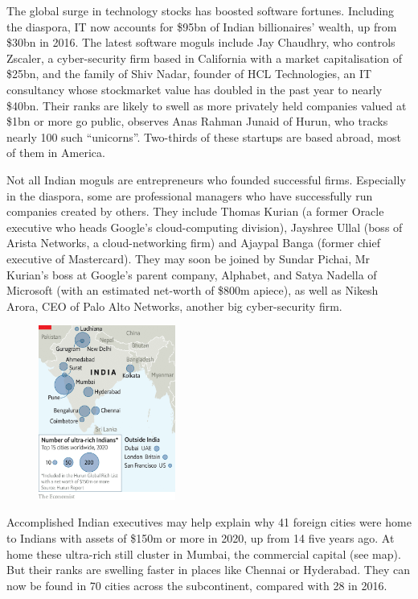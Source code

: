 \documentclass{article}
\begin{document}
The global surge in technology stocks has boosted software fortunes. Including the diaspora, IT now accounts for \$95bn of Indian billionaires' wealth, up from \$30bn in 2016. The latest software moguls include Jay Chaudhry, who controls Zscaler, a cyber-security firm based in California with a market capitalisation of \$25bn, and the family of Shiv Nadar, founder of HCL Technologies, an IT consultancy whose stockmarket value has doubled in the past year to nearly \$40bn. Their ranks are likely to swell as more privately held companies valued at \$1bn or more go public, observes Anas Rahman Junaid of Hurun, who tracks nearly 100 such ``unicorns''. Two-thirds of these startups are based abroad, most of them in America. 

Not all Indian moguls are entrepreneurs who founded successful firms. Especially in the diaspora, some are professional managers who have successfully run companies created by others. They include Thomas Kurian (a former Oracle executive who heads Google's cloud-computing division), Jayshree Ullal (boss of Arista Networks, a cloud-networking firm) and Ajaypal Banga (former chief executive of Mastercard). They may soon be joined by Sundar Pichai, Mr Kurian's boss at Google's parent company, Alphabet, and Satya Nadella of Microsoft (with an estimated net-worth of \$800m apiece), as well as Nikesh Arora, CEO of Palo Alto Networks, another big cyber-security firm. 

\begin{figure}[h]
\centering
\includegraphics[width=0.4\textwidth]{images/20210327_WBM945.png}
\end{figure}


Accomplished Indian executives may help explain why 41 foreign cities were home to Indians with assets of \$150m or more in 2020, up from 14 five years ago. At home these ultra-rich still cluster in Mumbai, the commercial capital (see map). But their ranks are swelling faster in places like Chennai or Hyderabad. They can now be found in 70 cities across the subcontinent, compared with 28 in 2016. 
\end{document}
